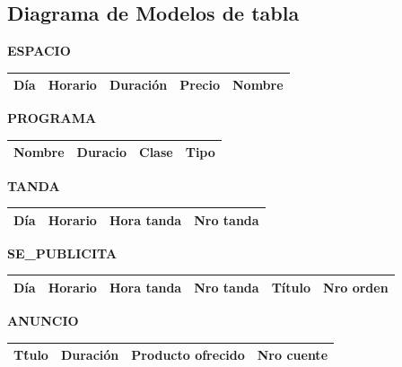 \documentclass[a4paper,10pt]{article}
\begin{document}
  \subsection{Diagrama de Modelos de tabla}
    \begin{flushleft}
      \begin{large} \bf{ESPACIO} \end{large}
      \newline
      \begin{tabular}{| l | l | l | l | l |}
	\hline D\'ia & Horario & Duraci\'on & Precio & Nombre \\ \hline
      \end{tabular}

      \begin{large} \bf{PROGRAMA} \end{large}
      \newline
      \begin{tabular}{| l | l | l | l |}
	\hline Nombre & Duracio & Clase & Tipo \\ \hline
      \end{tabular}

      \begin{large} \bf{TANDA} \end{large}
      \newline
      \begin{tabular}{| l | l | l | l |}
	\hline D\'ia & Horario & Hora tanda & Nro tanda \\ \hline
      \end{tabular}

      \begin{large} \bf{SE\_PUBLICITA} \end{large}
      \newline
      \begin{tabular}{| l | l | l | l | l | l |}
	\hline D\'ia & Horario & Hora tanda & Nro tanda & T\'itulo & Nro orden \\ \hline
      \end{tabular}

      \begin{large} \bf{ANUNCIO} \end{large}
      \newline
      \begin{tabular}{| l | l | l | l |}
	\hline T\'tulo & Duraci\'on & Producto ofrecido & Nro cuente \\ \hline
      \end{tabular}


\end{flushleft}
\end{document}
